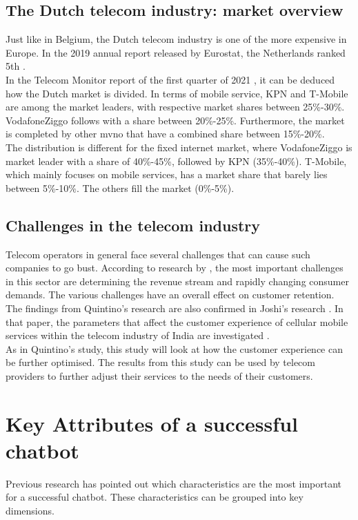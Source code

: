 \subsection{The Dutch telecom industry: market overview}
Just like in Belgium, the Dutch telecom industry is one of the more expensive in Europe. In the 2019 annual report released by Eurostat, the Netherlands ranked 5th \citep{Eurostat2020}.\\
In the Telecom Monitor report of the first quarter of 2021 \citep{Acm2021}, it can be deduced how the Dutch market is divided. In terms of mobile service, KPN and T-Mobile are among the market leaders, with respective market shares between 25\%-30\%. VodafoneZiggo follows with a share between 20\%-25\%. Furthermore, the market is completed by other \acrfull{mvno} that have a combined share between 15\%-20\%. \citep{Acm2021}\\
The distribution is different for the fixed internet market, where VodafoneZiggo is market leader with a share of 40\%-45\%, followed by KPN (35\%-40\%). T-Mobile, which mainly focuses on mobile services, has a market share that barely lies between 5\%-10\%. The others fill the market (0\%-5\%).\citep{Acm2021}

\subsection{Challenges in the telecom industry}
Telecom operators in general face several challenges that can cause such companies to go bust. According to research by \citeauthor{Quintino2019}, the most important challenges in this sector are determining the revenue stream and rapidly changing consumer demands. The various challenges have an overall effect on customer retention. The findings from Quintino's research are also confirmed in Joshi's research \citep{Joshi2014}. In that paper, the parameters that affect the customer experience of cellular mobile services within the telecom industry of India are investigated \citep*{Joshi2014, Quintino2019, Malviya2012}.\\
As in Quintino's study, this study will look at how the customer experience can be further optimised. The results from this study can be used by telecom providers to further adjust their services to the needs of their customers.

\section{Key Attributes of a successful chatbot}
Previous research \citep*{Muizzah2021, Verkeyn2018} has pointed out which characteristics are the most important for a successful chatbot. These characteristics can be grouped into key dimensions.

